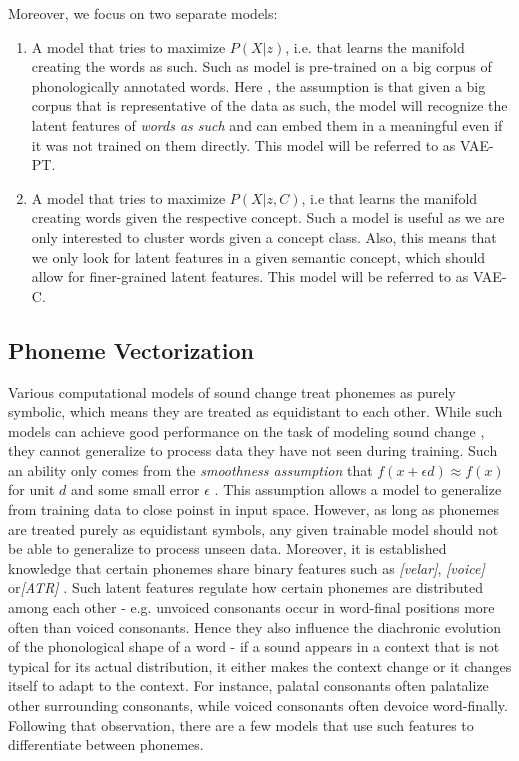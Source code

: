 \documentclass[6pt]{article}
\begin{document}
Moreover, we focus on two separate models:
\begin{enumerate}
\item A model that tries to maximize $P(X|z)$, i.e. that learns the manifold creating the words as such. Such as model is pre-trained on a big corpus of phonologically annotated words. Here , the assumption is that given a big corpus that is representative of the data as such, the model will recognize the latent features of \textit{words as such} and can embed them in a meaningful even if it was not trained on them directly. This model will be referred to as VAE-PT.
\item A model that tries to maximize $P(X|z,C)$, i.e that learns the manifold creating words given the respective concept. Such a model is useful as we are only interested to cluster words given a concept class. Also, this means that we only look for latent features in a given semantic concept, which should allow for finer-grained latent features. This model will be referred to as VAE-C.
\end{enumerate}


\subsection{Phoneme Vectorization}
\label{Phoneme Vectorization}
Various computational models of sound change treat phonemes as purely symbolic, which means they are treated as equidistant to each other. While such models can achieve good performance on the task of modeling sound change  \citep{bouchard2007probabilistic,bouchard2013automated}, they cannot generalize to process data they have not seen during training. Such an ability only comes from the \textit{smoothness assumption} that $f(x + \epsilon d) \approx f(x)$ for unit $d$ and some small error $\epsilon$ \citep[p. 555]{Goodfellow-et-al-2016-Book}. This assumption allows a model to generalize from training data to close poinst in input space.  However, as long as phonemes are treated purely as equidistant symbols, any given trainable model should not be able to generalize to process unseen data.
Moreover, it is established knowledge that certain phonemes share binary features such as \textit{[velar]}, \textit{[voice]}  or\textit{[ATR]} \citep{chomsky1968sound}. Such latent features regulate how certain phonemes are distributed among each other - e.g. unvoiced consonants occur in word-final positions more often than voiced consonants. Hence they also influence the diachronic evolution of the phonological shape of a word - if a sound appears in a context that is not typical for its actual distribution, it either makes the context change or it changes itself to adapt to the context. For instance, palatal consonants often palatalize other surrounding consonants, while voiced consonants often devoice word-finally.
Following that observation, there are a few models that use such features to differentiate between phonemes. 
\end{document}

